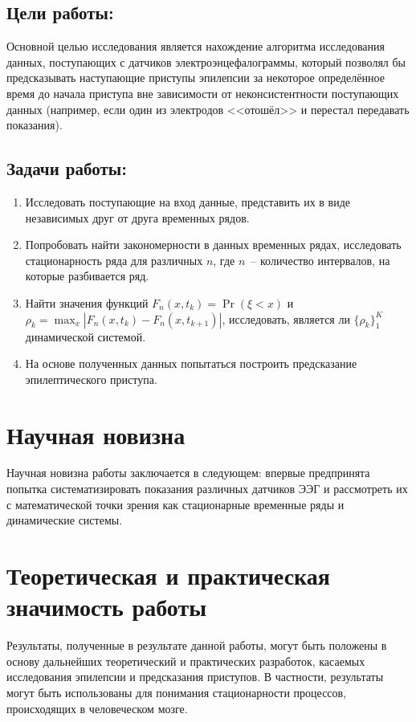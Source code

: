 \documentclass[a4paper,12pt]{report}
\begin{document}
\subsection{Цели работы:}

Основной целью исследования является нахождение алгоритма исследования данных, поступающих с датчиков электроэнцефалограммы, который позволял бы предсказывать наступающие приступы эпилепсии за некоторое определённое время до начала приступа вне зависимости от неконсистентности поступающих данных (например, если один из электродов <<отошёл>> и перестал передавать показания).

\subsection{Задачи работы:}

\begin{enumerate}
    \item Исследовать поступающие на вход данные, представить их в виде независимых друг от друга временных рядов.
    \item Попробовать найти закономерности в данных временных рядах, исследовать стационарность ряда для различных $n$, где $n$~-- количество интервалов, на которые разбивается ряд.
    \item Найти значения функций $F_n(x, t_k) = \Pr{(\xi < x)}$ и $\rho_k = \max_x{|F_n(x, t_k) - F_n(x, t_{k+1})|}$, исследовать, является ли $\{\rho_k\}_1^K$ динамической системой.
    \item На основе полученных данных попытаться построить предсказание эпилептического приступа.
\end{enumerate}

\section{Научная новизна}

Научная новизна работы заключается в следующем: впервые предпринята попытка систематизировать показания различных датчиков ЭЭГ и рассмотреть их с математической точки зрения как стационарные временные ряды и динамические системы.

\section{Теоретическая и практическая значимость работы}

Результаты, полученные в результате данной работы, могут быть положены в основу дальнейших теоретический и практических разработок, касаемых исследования эпилепсии и предсказания приступов. В частности, результаты могут быть использованы для понимания стационарности процессов, происходящих в человеческом мозге.
\end{document}
